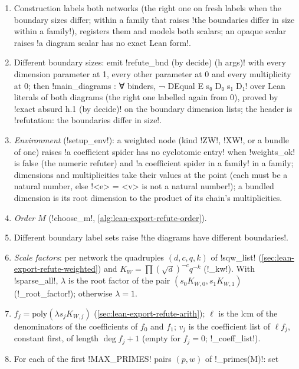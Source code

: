 {{{\begin{algorithm}\label{alg:lean-export-refute-run}
\begin{enumerate}
\item Construction labels both networks (the right one on fresh labels when the boundary sizes
differ; within a family that raises \lexcode!the boundaries differ in size within a family!),
registers them and models both scalars; an opaque scalar raises
\lexcode!a diagram scalar has no exact Lean form!.
\item Different boundary sizes: emit \lexlean!refute_bnd (by decide) (h args)! with every
dimension parameter at 1, every other parameter at 0 and every multiplicity at 0; then
\lexlean!main_diagrams : ∀ binders, ¬ DEqual E s₀ D₀ s₁ D₁! over Lean literals of both
diagrams (the right one labelled again from 0), proved by
\lexlean!exact absurd h.1 (by decide)! on the boundary dimension lists; the header is
\lexcode!refutation: the boundaries differ in size!.
\item \emph{Environment} (\lexpy!setup_env!): a weighted node (kind \lexcode!ZW!, \lexcode!XW!, or a
bundle of one) raises \lexcode!a coefficient spider has no cyclotomic entry! when \lexpy!weights_ok! is
false (the numeric refuter) and \lexcode!a coefficient spider in a family! in a family; dimensions
and multiplicities take their values at the point (each must be a natural number, else
\lexcode!<e> = <v> is not a natural number!); a bundled dimension is its root dimension to the
product of its chain's multiplicities.
\item \emph{Order} $M$ (\lexpy!choose_m!, \cref{alg:lean-export-refute-order}).
\item Different boundary label sets raise \lexcode!the diagrams have different boundaries!.
\item \emph{Scale factors}: per network the quadruples $(d, c, q, k)$ of \lexpy!sqw_list!
(\cref{sec:lean-export-refute-weighted}) and $K_W = \prod (\sqrt d)^{-c} q^{-k}$ (\lexpy!_kw!).
With \lexpy!sparse_all!, $\lambda$ is the root factor of the pair $(s_0K_{W,0}, s_1K_{W,1})$
(\lexpy!_root_factor!); otherwise $\lambda = 1$.
\item $f_j = \mathrm{poly}(\lambda s_jK_{W,j})$ (\cref{sec:lean-export-refute-arith}); $\ell$ is
the lcm of the denominators of the coefficients of $f_0$ and $f_1$; $v_j$ is the coefficient
list of $\ell f_j$, constant first, of length $\deg f_j + 1$ (empty for $f_j = 0$;
\lexpy!_coeff_list!).
\item For each of the first \lexpy!MAX_PRIMES! pairs $(p, w)$ of \lexpy!_primes(M)!: set

\end{enumerate}
\end{algorithm}}}}
